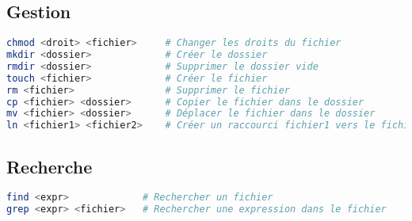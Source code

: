 \documentclass{article}
\begin{document}
\subsection{Gestion}
\begin{lstlisting}[language=bash]
chmod <droit> <fichier>     # Changer les droits du fichier
mkdir <dossier>             # Créer le dossier
rmdir <dossier>             # Supprimer le dossier vide
touch <fichier>             # Créer le fichier
rm <fichier>                # Supprimer le fichier
cp <fichier> <dossier>      # Copier le fichier dans le dossier
mv <fichier> <dossier>      # Déplacer le fichier dans le dossier
ln <fichier1> <fichier2>    # Créer un raccourci fichier1 vers le fichier2 
\end{lstlisting}

\subsection{Recherche}
\begin{lstlisting}[language=bash]
find <expr>             # Rechercher un fichier
grep <expr> <fichier>   # Rechercher une expression dans le fichier
\end{lstlisting}
\end{document}
